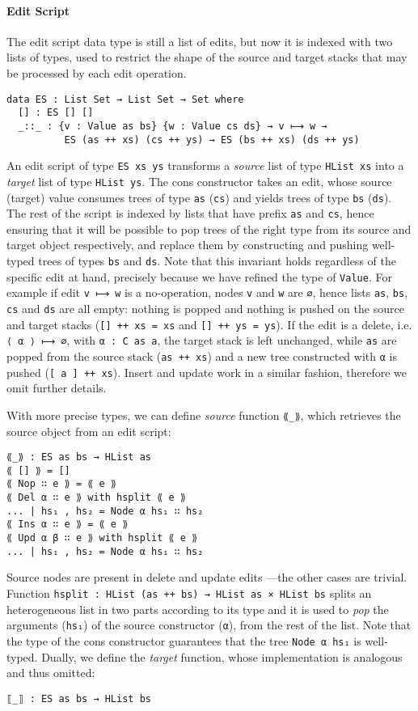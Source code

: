 \documentclass{sigplanconf}
\theoremstyle{plain}
\begin{document}
\paragraph{Edit Script}
The edit script data type is still a list of edits, but now it is
indexed with two lists of types, used to restrict the shape of the
source and target stacks that may be processed by each edit operation.
%
\begin{verbatim}
data ES : List Set → List Set → Set where
  [] : ES [] []
  _::_ : {v : Value as bs} {w : Value cs ds} → v ⟼ w → 
          ES (as ++ xs) (cs ++ ys) → ES (bs ++ xs) (ds ++ ys)
\end{verbatim}	
An edit script of type \texttt{ES xs ys} transforms a \emph{source}
list of type \texttt{HList xs} into a \emph{target} list of type
\texttt{HList ys}.  
%
The cons constructor takes an edit, whose source (target) value
consumes trees of type \texttt{as} (\texttt{cs}) and yields trees of
type \texttt{bs} (\texttt{ds}).
%
The rest of the script is indexed by lists that have prefix
\texttt{as} and \texttt{cs}, hence ensuring that it will be possible
to pop trees of the right type from its source and target object
respectively, and replace them by constructing and pushing well-typed
trees of types \texttt{bs} and \texttt{ds}.
%
Note that this invariant holds regardless of the specific edit at
hand, precisely because we have refined the type of \texttt{Value}.
%
For example if edit \texttt{v ⟼ w} is a no-operation, nodes \texttt{v}
and \texttt{w} are \texttt{∅}, hence lists \texttt{as}, \texttt{bs},
\texttt{cs} and \texttt{ds} are all empty: nothing is popped and
nothing is pushed on the source and target stacks (\texttt{[] ++ xs =
  xs} and \texttt{[] ++ ys = ys}).
%
If the edit is a delete, i.e. \texttt{⟨ α ⟩ ⟼ ∅}, with \texttt{α : C
  as a}, the target stack is left unchanged, while \texttt{as} are
popped from the source stack (\texttt{as ++ xs}) and a new tree
constructed with \texttt{α} is pushed (\texttt{[ a ] ++ xs}).
%
Insert and update work in a similar fashion, therefore we omit further
details.

%
With more precise types, we can define \emph{source} function
\texttt{⟪\_⟫}, which retrieves the source object from an edit script:

\begin{verbatim}
⟪_⟫ : ES as bs → HList as
⟪ [] ⟫ = []
⟪ Nop ∷ e ⟫ = ⟪ e ⟫
⟪ Del α ∷ e ⟫ with hsplit ⟪ e ⟫
... | hs₁ , hs₂ = Node α hs₁ ∷ hs₂
⟪ Ins α ∷ e ⟫ = ⟪ e ⟫
⟪ Upd α β ∷ e ⟫ with hsplit ⟪ e ⟫
... | hs₁ , hs₂ = Node α hs₁ ∷ hs₂
\end{verbatim}
%
Source nodes are present in delete and update edits ---the other cases
are trivial.
% 
Function \texttt{hsplit : HList (as ++ bs) → HList as × HList bs}
splits an heterogeneous list in two parts according to its type and it
is used to \emph{pop} the arguments (\texttt{hs₁}) of the source
constructor (\texttt{α}), from the rest of the list.
%
Note that the type of the cons constructor guarantees that the tree
\texttt{Node α hs₁} is well-typed.
%
Dually, we define the \emph{target} function, whose implementation is
analogous and thus omitted:
\begin{verbatim}
⟦_⟧ : ES as bs → HList bs
\end{verbatim}
\end{document}

